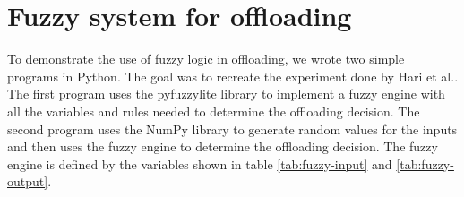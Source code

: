 \section*{Fuzzy system for offloading}

To demonstrate the use of fuzzy logic in offloading, we wrote two simple programs in Python. The goal was to recreate the experiment done by Hari et
al.\cite{Hari-et-al-2018}. The first program uses the pyfuzzylite\cite{fuzzylite} library to implement a fuzzy engine with all the variables and
rules needed to determine the offloading decision. The second program uses the NumPy library to generate random values for the inputs and then uses
the fuzzy engine to determine the offloading decision. The fuzzy engine is defined by the variables shown in table \ref{tab:fuzzy-input} and
\ref{tab:fuzzy-output}.

